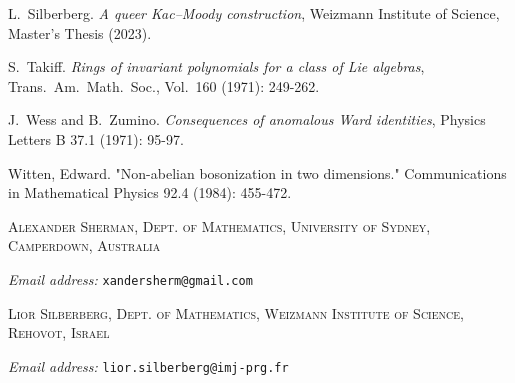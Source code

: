 \documentclass[12pt, a4paper, reqno]{amsart}
\theoremstyle{definition}
\theoremstyle{definition}
\theoremstyle{definition}
\numberwithin{theorem}{section}
\numberwithin{lemma}{section}
\numberwithin{remark}{section}
\numberwithin{definition}{section}
\numberwithin{corollary}{section}
\numberwithin{proposition}{section}
\numberwithin{example}{section}
\begin{document}
\begin{thebibliography}{99999999}
		 L.~Silberberg.  \emph{A queer Kac--Moody construction}, Weizmann Institute of Science, Master's Thesis (2023).
		
		 S.~Takiff.  \emph{Rings of invariant polynomials for a class of Lie algebras}, Trans.~Am.~Math.~Soc., Vol.~160 (1971):	249-262.
		
		 J.~Wess and B.~Zumino. \emph{Consequences of anomalous Ward identities}, Physics Letters B 37.1 (1971): 95-97. 
		
		 Witten, Edward. "Non-abelian bosonization in two dimensions." Communications in Mathematical Physics 92.4 (1984): 455-472.
		
	\end{thebibliography}
	
	\textsc{\footnotesize Alexander Sherman, Dept. of Mathematics, University of Sydney, Camperdown, Australia} 
	
	\textit{\footnotesize Email address:} \texttt{\footnotesize xandersherm@gmail.com}
	
	\textsc{\footnotesize Lior Silberberg, Dept. of Mathematics, Weizmann Institute of Science, Rehovot, Israel} 
	
	\textit{\footnotesize Email address:} \texttt{\footnotesize lior.silberberg@imj-prg.fr }
\end{document}
